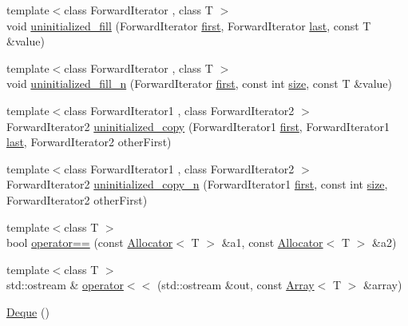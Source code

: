 \begin{DoxyCompactItemize}
\item 
{\footnotesize template$<$class Forward\+Iterator , class T $>$ }\\void \hyperlink{namespaceprism_a8234c2c7917f750db94bb068d6fd554e}{uninitialized\+\_\+fill} (Forward\+Iterator \hyperlink{namespaceprism_ae3fb7a1926a9e8e59300cd5e370470da}{first}, Forward\+Iterator \hyperlink{namespaceprism_abe4956c4e865f55ca126b7fb973b5078}{last}, const T \&value)
\item 
{\footnotesize template$<$class Forward\+Iterator , class T $>$ }\\void \hyperlink{namespaceprism_a5485ae7bad862f6ff0ab363ed4697b61}{uninitialized\+\_\+fill\+\_\+n} (Forward\+Iterator \hyperlink{namespaceprism_ae3fb7a1926a9e8e59300cd5e370470da}{first}, const int \hyperlink{namespaceprism_acd3c0f96adf158a29387191d79c4d874}{size}, const T \&value)
\item 
{\footnotesize template$<$class Forward\+Iterator1 , class Forward\+Iterator2 $>$ }\\Forward\+Iterator2 \hyperlink{namespaceprism_a5ff56f151fea6e709350a0e9fbdb70a8}{uninitialized\+\_\+copy} (Forward\+Iterator1 \hyperlink{namespaceprism_ae3fb7a1926a9e8e59300cd5e370470da}{first}, Forward\+Iterator1 \hyperlink{namespaceprism_abe4956c4e865f55ca126b7fb973b5078}{last}, Forward\+Iterator2 other\+First)
\item 
{\footnotesize template$<$class Forward\+Iterator1 , class Forward\+Iterator2 $>$ }\\Forward\+Iterator2 \hyperlink{namespaceprism_ad1c7d8eb38174ba66d98321b68047e6e}{uninitialized\+\_\+copy\+\_\+n} (Forward\+Iterator1 \hyperlink{namespaceprism_ae3fb7a1926a9e8e59300cd5e370470da}{first}, const int \hyperlink{namespaceprism_acd3c0f96adf158a29387191d79c4d874}{size}, Forward\+Iterator2 other\+First)
\item 
{\footnotesize template$<$class T $>$ }\\bool \hyperlink{namespaceprism_a1faf99d35e2cbb2b8c0644aa0b777e9b}{operator==} (const \hyperlink{classprism_1_1_allocator}{Allocator}$<$ T $>$ \&a1, const \hyperlink{classprism_1_1_allocator}{Allocator}$<$ T $>$ \&a2)
\item 
{\footnotesize template$<$class T $>$ }\\std\+::ostream \& \hyperlink{namespaceprism_a403ca8f79c481a89132691c0fd8c3a06}{operator$<$$<$} (std\+::ostream \&out, const \hyperlink{classprism_1_1_array}{Array}$<$ T $>$ \&array)
\item 
\hyperlink{namespaceprism_a8e77ed12f9b3a35d81935362d3050d0c}{Deque} ()

\end{DoxyCompactItemize}
